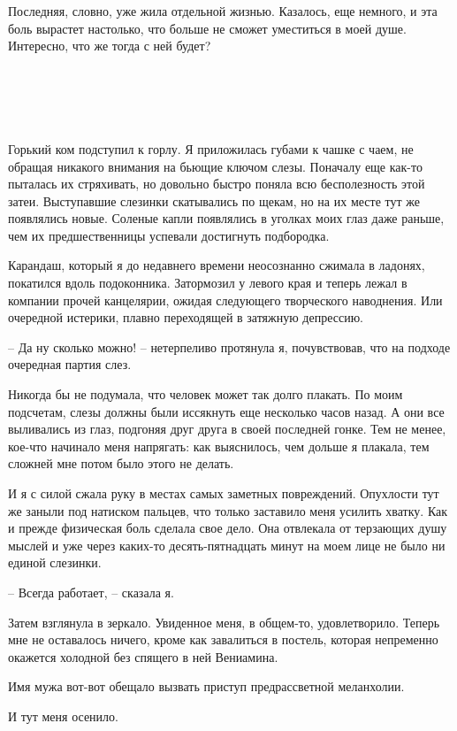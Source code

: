 \documentclass[
]{book}
\begin{document}
Последняя, словно, уже жила отдельной жизнью. Казалось, еще немного, и эта боль вырастет настолько, что больше не сможет уместиться в моей душе. Интересно, что же тогда с ней будет?

\hypertarget{chapter-59}{%
\chapter{~}\label{chapter-59}}

Горький ком подступил к горлу. Я приложилась губами к чашке с чаем, не обращая никакого внимания на бьющие ключом слезы. Поначалу еще как-то пыталась их стряхивать, но довольно быстро поняла всю бесполезность этой затеи. Выступавшие слезинки скатывались по щекам, но на их месте тут же появлялись новые. Соленые капли появлялись в уголках моих глаз даже раньше, чем их предшественницы успевали достигнуть подбородка.

Карандаш, который я до недавнего времени неосознанно сжимала в ладонях, покатился вдоль подоконника. Затормозил у левого края и теперь лежал в компании прочей канцелярии, ожидая следующего творческого наводнения. Или очередной истерики, плавно переходящей в затяжную депрессию.

-- Да ну сколько можно! -- нетерпеливо протянула я, почувствовав, что на подходе очередная партия слез.

Никогда бы не подумала, что человек может так долго плакать. По моим подсчетам, слезы должны были иссякнуть еще несколько часов назад. А они все выливались из глаз, подгоняя друг друга в своей последней гонке. Тем не менее, кое-что начинало меня напрягать: как выяснилось, чем дольше я плакала, тем сложней мне потом было этого не делать.

И я с силой сжала руку в местах самых заметных повреждений. Опухлости тут же заныли под натиском пальцев, что только заставило меня усилить хватку. Как и прежде физическая боль сделала свое дело. Она отвлекала от терзающих душу мыслей и уже через каких-то десять-пятнадцать минут на моем лице не было ни единой слезинки.

-- Всегда работает, -- сказала я.

Затем взглянула в зеркало. Увиденное меня, в общем-то, удовлетворило. Теперь мне не оставалось ничего, кроме как завалиться в постель, которая непременно окажется холодной без спящего в ней Вениамина.

Имя мужа вот-вот обещало вызвать приступ предрассветной меланхолии.

И тут меня осенило.
\end{document}
